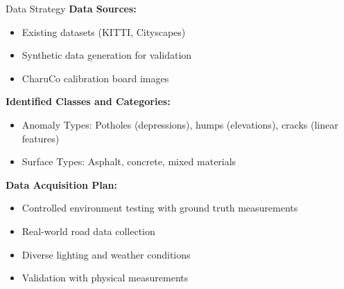 \documentclass[aspectratio=169]{beamer}
\begin{document}
\begin{frame}{Data Strategy}
\textbf{Data Sources:}
\begin{itemize}

\item Existing datasets (KITTI, Cityscapes)
\item Synthetic data generation for validation
\item CharuCo calibration board images
\end{itemize}

\vspace{0.5cm}

\textbf{Identified Classes and Categories:}
\begin{itemize}
\item Anomaly Types: Potholes (depressions), humps (elevations), cracks (linear features)
\item Surface Types: Asphalt, concrete, mixed materials
\end{itemize}

\vspace{0.5cm}

\textbf{Data Acquisition Plan:}
\begin{itemize}
\item Controlled environment testing with ground truth measurements
\item Real-world road data collection
\item Diverse lighting and weather conditions
\item Validation with physical measurements
\end{itemize}
\end{frame}
\end{document}
